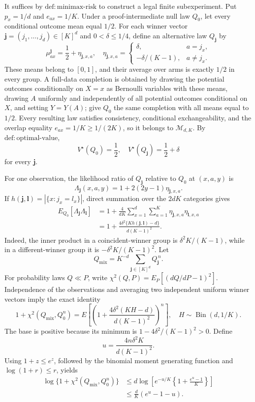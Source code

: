 It suffices by \(\mathrm{def{:}minimax\text{-}risk}\) to construct a legal finite subexperiment.  Put \(p_x=1/d\) and \(e_{ax}=1/K\).  Under a proof-intermediate null law \(Q_0\), let every conditional outcome mean equal \(1/2\).  For each winner vector \(\mathbf j=(j_1,\ldots,j_d)\in[K]^d\) and \(0<\delta\leq1/4\), define an alternative law \(Q_{\mathbf j}\) by
\[
 \mu^{\mathbf j}_{ax}=\frac12+\eta_{\mathbf j,x,a},\quad
 \eta_{\mathbf j,x,a}=
 \begin{cases}
 \delta,&a=j_x,\\
 -\delta/(K-1),&a\neq j_x.
 \end{cases}
\]
These means belong to \([0,1]\), and their average over arms is exactly \(1/2\) in every group.  A full-data completion is obtained by drawing the potential outcomes conditionally on \(X=x\) as Bernoulli variables with these means, drawing \(A\) uniformly and independently of all potential outcomes conditional on \(X\), and setting \(Y=Y(A)\); give \(Q_0\) the same completion with all means equal to \(1/2\).  Every resulting law satisfies consistency, conditional exchangeability, and the overlap equality \(e_{ax}=1/K\geq1/(2K)\), so it belongs to \(\mathcal M_{d,K}\).  By \(\mathrm{def{:}optimal\text{-}value}\),
\[
 V^\star(Q_0)=\frac12,\quad V^\star(Q_{\mathbf j})=\frac12+\delta
\]
for every \(\mathbf j\).

For one observation, the likelihood ratio of \(Q_{\mathbf j}\) relative to \(Q_0\) at \((x,a,y)\) is
\[
 \Lambda_{\mathbf j}(x,a,y)=1+2(2y-1)\eta_{\mathbf j,x,a}.
\]
If \(h(\mathbf j,\mathbf l)=|\{x:j_x=l_x\}|\), direct summation over the \(2dK\) categories gives
\[
 \begin{aligned}
 E_{Q_0}[\Lambda_{\mathbf j}\Lambda_{\mathbf l}]
 &=1+\frac4{dK}\sum_{x=1}^d\sum_{a=1}^K
      \eta_{\mathbf j,x,a}\eta_{\mathbf l,x,a}\\
 &=1+\frac{4\delta^2\{K h(\mathbf j,\mathbf l)-d\}}
               {d(K-1)^2}.
 \end{aligned}
\]
Indeed, the inner product in a coincident-winner group is \(\delta^2K/(K-1)\), while in a different-winner group it is \(-\delta^2K/(K-1)^2\).  Let
\[
 Q_{\mathrm{mix}}=K^{-d}\sum_{\mathbf j\in[K]^d}Q_{\mathbf j}^{\,n}.
\]
For probability laws \(Q\ll P\), write
\(\chi^2(Q,P)=E_P[(dQ/dP-1)^2]\).
Independence of the observations and averaging two independent uniform winner vectors imply the exact identity
\[
 1+\chi^2(Q_{\mathrm{mix}},Q_0^n)
 =E\left[\left(1+\frac{4\delta^2(KH-d)}{d(K-1)^2}\right)^n\right],
 \quad H\sim\operatorname{Bin}(d,1/K).
\]
The base is positive because its minimum is \(1-4\delta^2/(K-1)^2>0\).  Define
\[
 u=\frac{4n\delta^2K}{d(K-1)^2}.
\]
Using \(1+z\leq e^z\), followed by the binomial moment generating function and \(\log(1+r)\leq r\), yields
\[
 \begin{aligned}
 \log\{1+\chi^2(Q_{\mathrm{mix}},Q_0^n)\}
 &\leq d\log\left[e^{-u/K}\left\{1+\frac{e^u-1}{K}\right\}\right]\\
 &\leq\frac dK(e^u-1-u).
 \end{aligned}
\]

